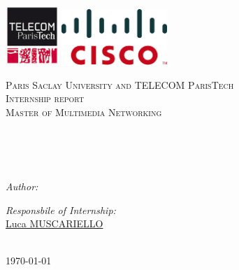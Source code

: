 \documentclass[11pt, oneside]{Thesis} %
\begin{document}
\begin{titlepage}

\begin{center}
 \includegraphics[width=0.15\textwidth,natwidth=610,natheight=642]{telecom.jpeg}
 \includegraphics[width=0.3\textwidth,natwidth=610,natheight=642]{cisco.png}

\textsc{\LARGE Paris Saclay University and TELECOM ParisTech}\\[1.5cm] %
\textsc{\Large Internship report \\ Master of Multimedia Networking} %

\HRule \\[0.2cm] %
{\huge \bfseries \ttitle}\\[0.4cm] %
\HRule \\[1.2cm] %


\begin{minipage}{0.4\textwidth}

\begin{flushleft} \large
\emph{Author:}\\
{\authornames} %
\end{flushleft}
\end{minipage}
\begin{minipage}{0.4\textwidth}

\begin{flushright} \large
\emph{Responsbile of Internship:}\\
\href{https://scholar.google.com/citations?user=Q36qUAsAAAAJ&hl=fr}{Luca MUSCARIELLO}\\
\end{flushright}

\end{minipage}\\[1.8cm]






{\large \today}
\vfill
\end{center}

\end{titlepage}
\end{document}

